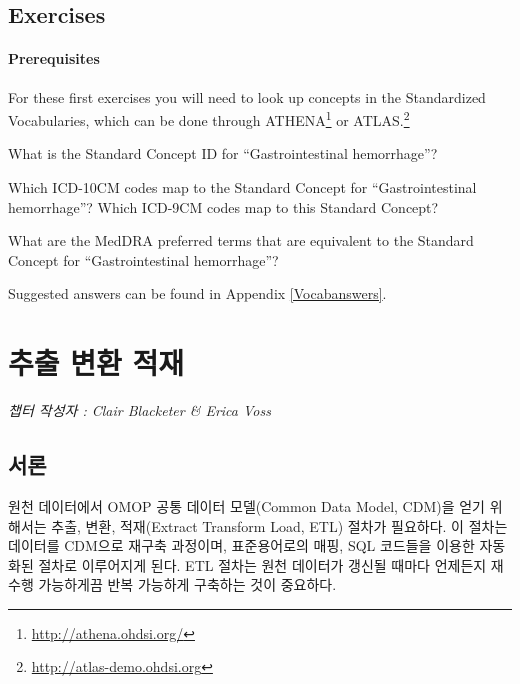 \documentclass[11pt]{book}
\let\rmarkdownfootnote\footnote%
\def\footnote{\protect\rmarkdownfootnote}
\theoremstyle{definition}
\theoremstyle{definition}
\theoremstyle{definition}
\theoremstyle{remark}
\let\BeginKnitrBlock\begin \let\EndKnitrBlock\end
\begin{document}
\section{Exercises}\label{exercises}

\subsubsection*{Prerequisites}\label{prerequisites}

For these first exercises you will need to look up concepts in the
Standardized Vocabularies, which can be done through ATHENA\footnote{\url{http://athena.ohdsi.org/}}
or ATLAS.\footnote{\url{http://atlas-demo.ohdsi.org}}

\BeginKnitrBlock{exercise}
\protect\hypertarget{exr:exerciseVocab1}{}{\label{exr:exerciseVocab1} }What
is the Standard Concept ID for ``Gastrointestinal hemorrhage''?
\EndKnitrBlock{exercise}

\BeginKnitrBlock{exercise}
\protect\hypertarget{exr:exerciseVocab2}{}{\label{exr:exerciseVocab2} }Which
ICD-10CM codes map to the Standard Concept for ``Gastrointestinal
hemorrhage''? Which ICD-9CM codes map to this Standard Concept?
\EndKnitrBlock{exercise}

\BeginKnitrBlock{exercise}
\protect\hypertarget{exr:exerciseVocab3}{}{\label{exr:exerciseVocab3} }What
are the MedDRA preferred terms that are equivalent to the Standard
Concept for ``Gastrointestinal hemorrhage''?
\EndKnitrBlock{exercise}

Suggested answers can be found in Appendix \ref{Vocabanswers}.

\chapter{추출 변환 적재}\label{ExtractTransformLoad}

\emph{챕터 작성자 : Clair Blacketer \& Erica Voss}

\section{서론}

원천 데이터에서 OMOP 공통 데이터 모델(Common Data Model, CDM)을 얻기
위해서는 추출, 변환, 적재(Extract Transform Load, ETL) 절차가 필요하다.
이 절차는 데이터를 CDM으로 재구축 과정이며, 표준용어로의 매핑, SQL
코드들을 이용한 자동화된 절차로 이루어지게 된다. ETL 절차는 원천
데이터가 갱신될 때마다 언제든지 재수행 가능하게끔 반복 가능하게 구축하는
것이 중요하다. 
 
\end{document}
